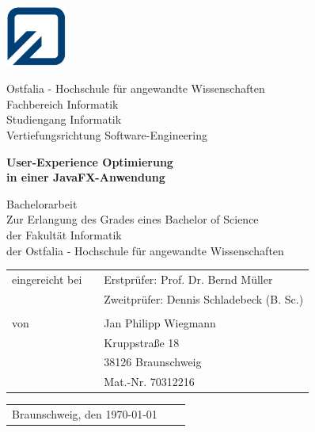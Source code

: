
\begin{titlepage}

	\thispagestyle{empty}
	
	\begin{minipage}{2.1cm}
		\includegraphics[width=2cm]{grafiken/fh_logo_klein.jpg}
	\end{minipage}
	\begin{minipage}{10.0cm}
		Ostfalia - Hochschule für angewandte Wissenschaften\\
		Fachbereich Informatik\\
		Studiengang Informatik\\
		Vertiefungsrichtung Software-Engineering
	\end{minipage}

	\vspace{15mm}

	\begin{center}
		\LARGE \textbf{User-Experience Optimierung \\ in einer JavaFX-Anwendung\\[10mm]}
	\end{center}
	
	\begin{center}
		\normalsize Bachelorarbeit\\[1cm]
		Zur Erlangung des Grades eines Bachelor of Science\\ 
		der Fakultät Informatik\\
		der Ostfalia - Hochschule für angewandte Wissenschaften\\[10mm]
	\end{center}

	\begin{table}[h]
		\centering
		\hspace{50mm}\begin{tabular}{lcl}
			eingereicht bei &  & Erstprüfer: Prof. Dr. Bernd Müller\\
			& & Zweitprüfer: Dennis Schladebeck (B. Sc.) \\
			& & \\
			von & & Jan Philipp Wiegmann\\
			& & Kruppstraße 18\\
			& & 38126 Braunschweig\\
			& & Mat.-Nr. 70312216\\
		\end{tabular}
	\end{table}

	\vspace{20mm}

	\begin{table}[h]
		\begin{tabular}{lll}
			Braunschweig, den \today\\
		\end{tabular}
	\end{table}

\end{titlepage}
